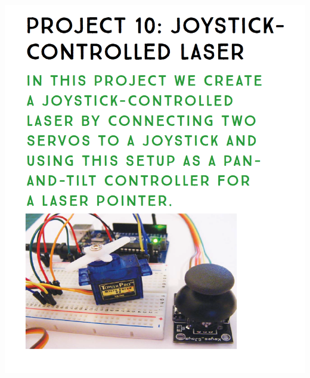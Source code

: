 \documentclass{article}
\begin{document}

\begin{center}
\includegraphics[width=\textwidth, height=20cm]{title.png}
\end{center}
\end{document}
